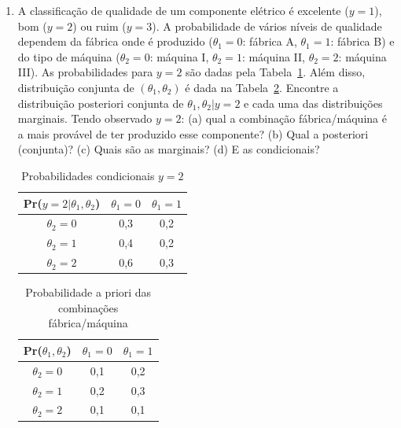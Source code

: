 \documentclass[11pt,a4]{article}\usepackage[]{graphicx}\usepackage[]{xcolor}
\begin{document}
\begin{enumerate}
  
\item A classificação de qualidade de um componente elétrico é excelente ($y = 1$), bom ($y = 2$) ou ruim ($y = 3$). A probabilidade de vários níveis de qualidade dependem da fábrica onde é produzido ($\theta_1 = 0$: fábrica A, $\theta_1 = 1$: fábrica B) e do tipo de máquina ($\theta_2 = 0$: máquina I, $\theta_2 = 1$: máquina II, $\theta_2 = 2$: máquina III). As probabilidades para $y = 2$ são dadas pela Tabela~\ref{tab:exerc1a-cap4}.
Além disso, distribuição conjunta de $(\theta_1, \theta_2)$ é dada na Tabela~\ref{tab:exerc1b-cap4}.
Encontre a distribuição posteriori conjunta de $\theta_1, \theta_2|y = 2$ e cada uma das distribuições marginais. Tendo observado $y = 2$:
(a) qual a combinação fábrica/máquina é a mais provável de ter produzido esse componente? (b) Qual a posteriori (conjunta)? (c) Quais são as marginais? (d) E as condicionais?  


\begin{table}[ht!]
\centering
\caption{Probabilidades condicionais $y = 2$}
\label{tab:exerc1a-cap4}
  \begin{tabular}{c| c c}
    Pr($y = 2|\theta_1, \theta_2$)         &$\theta_1 = 0$          &$\theta_1 =1$\\
    \hline
    $\theta_2 = 0$                         &0,3                    &0,2\\
    $\theta_2 = 1$                         &0,4                    &0,2\\
    $\theta_2 = 2$                         &0,6                    &0,3\\
    \hline
  \end{tabular}
\end{table}

\begin{table}[ht!]
\centering
\caption{Probabilidade a priori das combinações fábrica/máquina}
\label{tab:exerc1b-cap4}
  \begin{tabular}{c| c c}
    Pr($\theta_1, \theta_2$)               &$\theta_1 = 0$          &$\theta_1 =1$\\
    \hline
    $\theta_2 = 0$                         &0,1                    &0,2\\
    $\theta_2 = 1$                         &0,2                    &0,3\\
    $\theta_2 = 2$                         &0,1                    &0,1\\
    \hline  
\end{tabular}
\end{table}


\end{enumerate}
\end{document}
